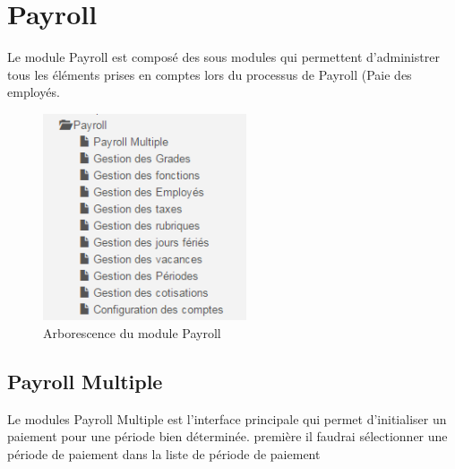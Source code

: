 \documentclass[12pt,a4paper]{report}
\begin{document}
\newpage
\chapter{Payroll}        
Le module Payroll est composé des sous modules qui permettent d'administrer tous les éléments prises en comptes lors du processus de Payroll (Paie des employés.

\begin{figure}[h]
\begin{center}
\includegraphics[width=6cm]{pic/PayrollArbo.png}
\end{center}
\caption{Arborescence du module Payroll}
\label{Arborescence du module Payroll}
\end{figure}

\section{Payroll Multiple}
Le modules Payroll Multiple est l'interface principale qui permet d'initialiser un paiement pour une période bien déterminée.
première il faudrai sélectionner une période de paiement dans la liste de période de paiement
\end{document}

